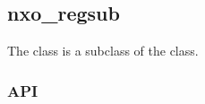 %
%
%
%
%              

\subsection{nxo\_regsub}
\label{nxo_regsub}

The  class is a subclass of the  class.

\subsubsection{API}
